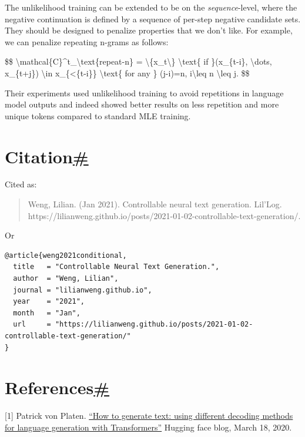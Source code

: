 The unlikelihood training can be extended to be on the \emph{sequence}-level, where the negative continuation is defined by a sequence of per-step negative candidate sets. They should be designed to penalize properties that we don't like. For example, we can penalize repeating n-grams as follows:

\$\$ \textbackslash mathcal\{C\}\^{}t\_\textbackslash text\{repeat-n\} = \textbackslash\{x\_t\textbackslash\} \textbackslash text\{ if \}(x\_\{t-i\}, \textbackslash dots, x\_\{t+j\}) \textbackslash in x\_\{\textless\{t-i\}\} \textbackslash text\{ for any \} (j-i)=n, i\textbackslash leq n \textbackslash leq j. \$\$

Their experiments used unlikelihood training to avoid repetitions in language model outputs and indeed showed better results on less repetition and more unique tokens compared to standard MLE training.

\section{\texorpdfstring{Citation\hyperref[citation]{\#}}{Citation\#}}\label{citation}

Cited as:

\begin{quote}
Weng, Lilian. (Jan 2021). Controllable neural text generation. Lil'Log. https://lilianweng.github.io/posts/2021-01-02-controllable-text-generation/.
\end{quote}

Or

\begin{verbatim}
@article{weng2021conditional,
  title   = "Controllable Neural Text Generation.",
  author  = "Weng, Lilian",
  journal = "lilianweng.github.io",
  year    = "2021",
  month   = "Jan",
  url     = "https://lilianweng.github.io/posts/2021-01-02-controllable-text-generation/"
}
\end{verbatim}

\section{\texorpdfstring{References\hyperref[references]{\#}}{References\#}}\label{references}

{[}1{]} Patrick von Platen. \href{https://huggingface.co/blog/how-to-generate}{``How to generate text: using different decoding methods for language generation with Transformers''} Hugging face blog, March 18, 2020.

